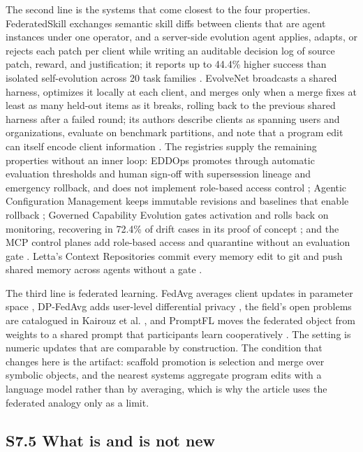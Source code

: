 \documentclass[
]{article}
\begin{document}
The second line is the systems that come closest to the four properties.
FederatedSkill exchanges semantic skill diffs between clients that are
agent instances under one operator, and a server-side evolution agent
applies, adapts, or rejects each patch per client while writing an
auditable decision log of source patch, reward, and justification; it
reports up to 44.4\% higher success than isolated self-evolution across
20 task families \cite{yang2026federatedskill}. EvolveNet broadcasts a
shared harness, optimizes it locally at each client, and merges only
when a merge fixes at least as many held-out items as it breaks, rolling
back to the previous shared harness after a failed round; its authors
describe clients as spanning users and organizations, evaluate on
benchmark partitions, and note that a program edit can itself encode
client information \cite{nie2026evolvenet}. The registries supply the
remaining properties without an inner loop: EDDOps promotes through
automatic evaluation thresholds and human sign-off with supersession
lineage and emergency rollback, and does not implement role-based access
control \cite{kang2026registry}; Agentic Configuration Management keeps
immutable revisions and baselines that enable rollback
\cite{quessadavial2026acm}; Governed Capability Evolution gates
activation and rolls back on monitoring, recovering in 72.4\% of drift
cases in its proof of concept \cite{qin2026governed}; and the MCP
control planes add role-based access and quarantine without an
evaluation gate
\cite{agenticcommunity2026mcpgateway, microsoft2026apicentermcp, truefoundry2026mcpgateway}.
Letta's Context Repositories commit every memory edit to git and push
shared memory across agents without a gate \cite{letta2026memfs}.

The third line is federated learning. FedAvg averages client updates in
parameter space \cite{mcmahan2017fedavg}, DP-FedAvg adds user-level
differential privacy \cite{mcmahan2018dpfedavg}, the field's open
problems are catalogued in Kairouz et al. \cite{kairouz2021federated},
and PromptFL moves the federated object from weights to a shared prompt
that participants learn cooperatively \cite{guo2022promptfl}. The
setting is numeric updates that are comparable by construction. The
condition that changes here is the artifact: scaffold promotion is
selection and merge over symbolic objects, and the nearest systems
aggregate program edits with a language model rather than by averaging,
which is why the article uses the federated analogy only as a limit.

\subsection{S7.5 What is and is not
new}\label{s7.5-what-is-and-is-not-new}
\end{document}
